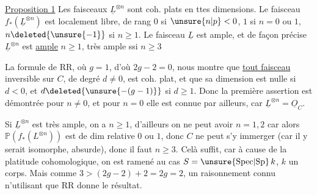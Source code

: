 \uline{Proposition 1} Les faisceaux $\underline L^{\otimes n}$ sont coh. plats en ttes dimensions. Le faisceau $f_*(\underline L^{\otimes n})$ est localement libre, de rang $0$ si $\unsure{n|p}<0$, $1$ si $n=0$ ou $1$, $n\deleted{\unsure{-1}}$ si $n\geq1$.  Le faisceau $\underline L$ est ample, et de façon précise $\underline L^{\otimes n}$ est  \uline{ample}  $n\geq1$, très ample ssi $n\geq3$

La formule de RR, où $g=1$, d'où $2g-2=0$, nous montre que \uline{tout faisceau}  inversible sur $C$, de degré  $d\ne0$, est coh. plat, et que sa dimension est  nulle si $d<0$, et $d\deleted{\unsure{-(g-1)}}$ si $d\geq1$. Donc la première assertion est démontrée pour $n\ne0$, et pour $n=0$ elle est connue par ailleurs, car $\underline L^{\otimes n}=\underline O_C$.

 

Si $\underline L^{\otimes n}$ est très ample, on a $n\geq1$, d'ailleurs on ne peut avoir $n=1,2$ car alors $\mathbb P(f_*(L^{\otimes n}))$ est de dim relative $0$ ou $1$, donc $C$ ne peut s'y immerger (car il y serait isomorphe, absurde), donc il faut $n\geq3$. Celà suffit, car à cause de la platitude cohomologique,   on est ramené au cas  $S=\unsure{\mathrm{Spec}|{\mathrm{Sp}}}\,k$, $k$ un corps.  Mais  comme $3>(2g-2)+2=2g=2$, un raisonnement connu n'utilisant que RR donne le résultat.
